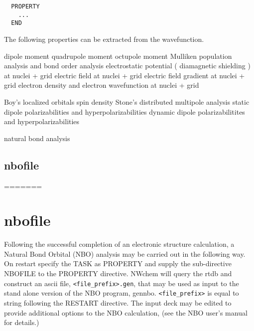 \label{sec:property}
\begin{verbatim}
  PROPERTY
    ...
  END
\end{verbatim}

The following properties can be extracted from the wavefunction.

dipole moment
quadrupole moment
octupole moment
Mulliken population analysis and bond order analysis
electrostatic potential ( diamagnetic shielding ) at nuclei + grid
electric field at nuclei + grid
electric field gradient at nuclei + grid
electron density and electron wavefunction at nuclei + grid

Boy's localized orbitals
spin density
Stone's distributed multipole analysis
static dipole polarizabilities and hyperpolarizabilities
dynamic dipole polarizabilitites and hyperpolarizabilities 

natural bond analysis

\subsection{nbofile}
=======
\section{nbofile}
Following the successful completion of an electronic structure
calculation, a Natural Bond Orbital (NBO) analysis may be carried out
in the following way.  On restart specify the TASK as PROPERTY and
supply the sub-directive NBOFILE to the PROPERTY directive.  NWchem
will query the rtdb and construct an ascii file,
\verb+<file_prefix>.gen+, that may be used as input to the stand alone
version of the NBO program, gennbo.  \verb+<file_prefix>+ is equal to
string following the RESTART directive.  The input deck may be edited
to provide additional options to the NBO calculation, (see the NBO
user's manual for details.)

